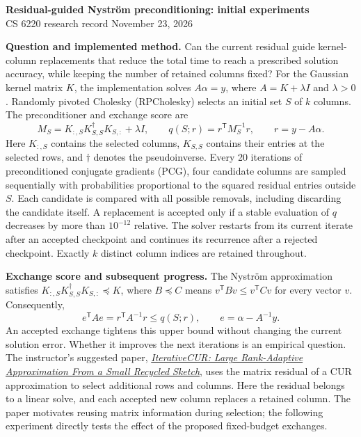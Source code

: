 \documentclass[11pt,letterpaper]{article}
\newcommand{\nystrom}{Nystr\"om}
\begin{document}
\begin{center}
{\large\bfseries Residual-guided \nystrom{} preconditioning: initial experiments}\\[4pt]
CS 6220 research record \qquad November 23, 2026
\end{center}

\textbf{Question and implemented method.}
Can the current residual guide kernel-column replacements that reduce the total
time to reach a prescribed solution accuracy, while keeping the number of
retained columns fixed?
For the Gaussian kernel matrix $K$, the implementation solves
$A\alpha=y$, where $A=K+\lambda I$ and $\lambda>0$.
Randomly pivoted Cholesky (RPCholesky) selects an initial set $S$ of $k$ columns. The
preconditioner and exchange score are
\[
M_S=K_{:,S}K_{S,S}^{\dagger}K_{S,:}+\lambda I,
\qquad q(S;r)=r^{\mathsf T}M_S^{-1}r,
\qquad r=y-A\alpha.
\]
Here $K_{:,S}$ contains the selected columns, $K_{S,S}$ contains their entries
at the selected rows, and $\dagger$ denotes the pseudoinverse.
Every 20 iterations of preconditioned conjugate gradients (PCG), four candidate
columns are sampled sequentially with probabilities proportional to the squared
residual entries outside $S$. Each candidate is compared with all possible
removals, including discarding the candidate itself. A replacement is accepted
only if a stable evaluation of $q$ decreases by more than $10^{-12}$ relative.
The solver restarts from its current iterate after an accepted checkpoint and
continues its recurrence after a rejected checkpoint. Exactly $k$ distinct
column indices are retained throughout.

\textbf{Exchange score and subsequent progress.}
The \nystrom{} approximation satisfies
$K_{:,S}K_{S,S}^{\dagger}K_{S,:}\preceq K$, where $B\preceq C$ means
$v^{\mathsf T}Bv\leq v^{\mathsf T}Cv$ for every vector $v$. Consequently,
\[
e^{\mathsf T}Ae=r^{\mathsf T}A^{-1}r\leq q(S;r),
\qquad e=\alpha-A^{-1}y.
\]
An accepted exchange tightens this upper bound without changing the current solution
error. Whether it improves the next iterations is an empirical question.
The instructor's suggested paper,
\href{https://arxiv.org/abs/2509.21963v2}{\emph{IterativeCUR: Large Rank-Adaptive
Approximation From a Small Recycled Sketch}}, uses the matrix residual of a CUR
approximation to select additional rows and columns. Here the residual belongs
to a linear solve, and each accepted new column replaces a retained column.
The paper motivates reusing matrix information during selection; the following
experiment directly tests the effect of the proposed fixed-budget exchanges.
\end{document}
